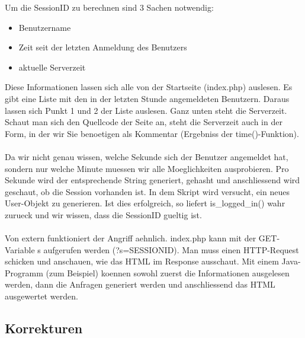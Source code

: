 Um die SessionID zu berechnen sind 3 Sachen notwendig:
 \begin{itemize}
    \item Benutzername
    \item Zeit seit der letzten Anmeldung des Benutzers
    \item aktuelle Serverzeit
\end{itemize}
Diese Informationen lassen sich alle von der Startseite (index.php) auslesen. Es gibt eine Liste mit den in der letzten Stunde angemeldeten Benutzern. Daraus lassen sich Punkt 1 und 2 der Liste auslesen. Ganz unten steht die Serverzeit. Schaut man sich den Quellcode der Seite an, steht die Serverzeit auch in der Form, in der wir Sie benoetigen als Kommentar (Ergebniss der time()-Funktion).\\\\
Da wir nicht genau wissen, welche Sekunde sich der Benutzer angemeldet hat, sondern nur welche Minute muessen wir alle Moeglichkeiten ausprobieren. Pro Sekunde wird der entsprechende String generiert, gehasht und anschliessend wird geschaut, ob die Session vorhanden ist. In dem Skript wird versucht, ein neues User-Objekt zu generieren. Ist dies erfolgreich, so liefert is\_logged\_in() wahr zurueck und wir wissen, dass die SessionID gueltig ist.\\\\
Von extern funktioniert der Angriff aehnlich. index.php kann mit der GET-Variable s aufgerufen werden (?s=SESSIONID). Man muss einen HTTP-Request schicken und anschauen, wie das HTML im Response ausschaut. Mit einem Java-Programm (zum Beispiel) koennen sowohl zuerst die Informationen ausgelesen werden, dann die Anfragen generiert werden und anschliessend das HTML ausgewertet werden.

\subsection{Korrekturen}

